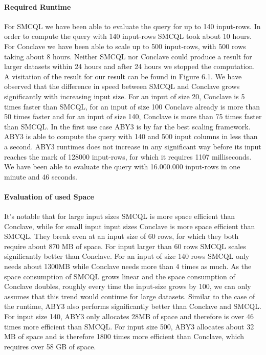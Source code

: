 \paragraph{Required Runtime}
For SMCQL we have been able to evaluate the query for up to 140 input-rows. In order to compute the query with 140 input-rows SMCQL took about 10 hours. For Conclave we have been able to scale up to 500 input-rows, with 500 rows taking about 8 hours. Neither SMCQL nor Conclave could produce a result for larger datasets within 24 hours and after 24 hours we stopped the computation. A visitation of the result for our result can be found in Figure 6.1.
We have observed that the difference in speed between SMCQL and Conclave grows significantly with increasing input size. For an input of size 20, Conclave is 5 times faster than SMCQL, for an input of size 100 Conclave already is more than 50 times faster and for an input of size 140, Conclave is more than 75 times faster than SMCQL. In the first use case ABY3 is by far the best scaling framework. ABY3 is able to compute the query with 140 and 500 input columns in less than a second. ABY3 runtimes does not increase in any significant way before its input reaches the mark of 128000 input-rows, for which it requires 1107 milliseconds. We have been able to evaluate the query with 16.000.000 input-rows in one minute and 46 seconds. 
\paragraph{Evaluation of used Space}
It's notable that for large input sizes SMCQL is more space efficient than Conclave, while for small input input sizes Conclave is more space efficient than SMCQL. They break even at an input size of 60 rows, for which they both require about 870 MB of space.  For input larger than 60 rows SMCQL scales significantly better than Conclave. For an input of size 140 rows SMCQL only needs about 1300MB while Conclave needs more than 4 times as much. As the space consumption of SMCQL grows linear and the space consumption of Conclave doubles, roughly every time the input-size grows by 100, we can only assumes that this trend would continue for large datasets. Similar to the case of the runtime, ABY3 also performs significantly better than Conclave and SMCQL. For input size 140, ABY3 only allocates 28MB of space and therefore is over 46 times more efficient than SMCQL. For input size 500, ABY3 allocates about 32 MB of space and is therefore 1800 times more efficient than Conclave, which requires over 58 GB of space.          

